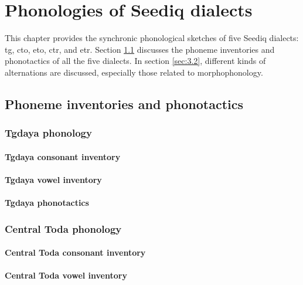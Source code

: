 \chapter{Phonologies of Seediq dialects}\label{ch3}
This chapter provides the synchronic phonological sketches of five Seediq dialects: \acl{tg}, \acl{cto}, \acl{eto}, \acl{ctr}, and \acl{etr}. Section \ref{sec:3.1} discusses the phoneme inventories and phonotactics of all the five dialects. In section \ref{sec:3.2}, different kinds of alternations are discussed, especially those related to morphophonology.

\section{Phoneme inventories and phonotactics} \label{sec:3.1}

\lipsum[1]

\subsection{Tgdaya phonology}
\lipsum[1]

\subsubsection{Tgdaya consonant inventory}
\lipsum[1-3]

\subsubsection{Tgdaya vowel inventory}
\lipsum[1-2]

\subsubsection{Tgdaya phonotactics}
\lipsum[1-5]

\subsection{Central Toda phonology}
\lipsum[1]

\subsubsection{Central Toda consonant inventory}
\lipsum[1-3]

\subsubsection{Central Toda vowel inventory}
\lipsum[1-2]

